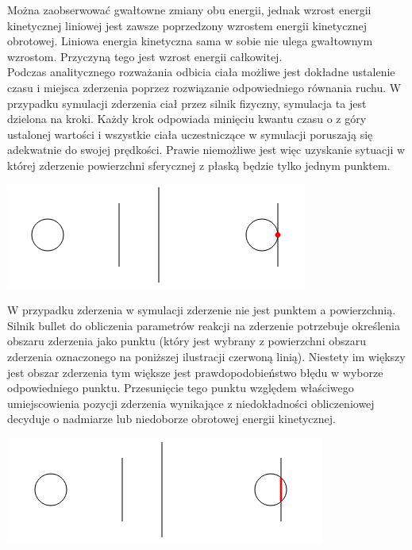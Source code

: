 Można zaobserwować gwałtowne zmiany obu energii, jednak wzrost energii
kinetycznej liniowej jest zawsze poprzedzony wzrostem energii kinetycznej
obrotowej. Liniowa energia kinetyczna sama w sobie nie ulega gwałtownym
wzrostom. Przyczyną tego jest wzrost energii całkowitej.\\
Podczas analitycznego rozważania odbicia ciała możliwe jest dokładne ustalenie
czasu i miejsca zderzenia poprzez rozwiązanie odpowiedniego równania ruchu. W
przypadku symulacji zderzenia ciał przez silnik fizyczny, symulacja ta jest
dzielona na kroki. Każdy krok odpowiada minięciu kwantu czasu o z góry ustalonej
wartości i wszystkie ciała uczestniczące w symulacji poruszają się adekwatnie do
swojej prędkości. Prawie niemożliwe jest więc uzyskanie sytuacji w której
zderzenie powierzchni sferycznej z płaską będzie tylko jednym punktem.

\begin{center}
\includegraphics{./img/zderzenie1.png}
\end{center}

W przypadku zderzenia w symulacji zderzenie nie jest punktem a powierzchnią.
Silnik bullet do obliczenia parametrów reakcji na zderzenie potrzebuje
określenia obszaru zderzenia jako punktu (który jest wybrany z powierzchni
obszaru zderzenia oznaczonego na poniższej ilustracji czerwoną linią). Niestety
im większy jest obszar zderzenia tym większe jest prawdopodobieństwo błędu w
wyborze odpowiedniego punktu. Przesunięcie tego punktu względem właściwego
umiejscowienia pozycji zderzenia wynikające z niedokładności obliczeniowej
decyduje o nadmiarze lub niedoborze obrotowej energii kinetycznej.

\begin{center}
\includegraphics{./img/zderzenie2.png}
\end{center}


